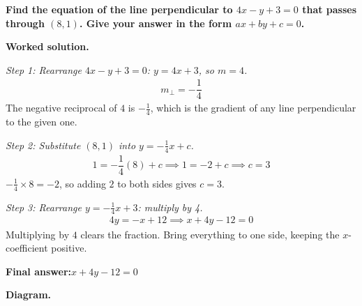 \documentclass[11pt]{article}
\newcommand{\question}[1]{\par\medskip\noindent\textbf{#1}\par}
\begin{document}
\question{Find the equation of the line perpendicular to \( 4x - y + 3 = 0 \) that passes through \( (8, 1) \). Give your answer in the form \( ax + by + c = 0 \).}

\textbf{Worked solution.}

\textit{Step 1: Rearrange \( 4x - y + 3 = 0 \): \( y = 4x + 3 \), so \( m = 4 \).}
\[\begin{gathered}
m_\perp = -\dfrac{1}{4}
\end{gathered}\]
The negative reciprocal of \( 4 \) is \( -\tfrac{1}{4} \), which is the gradient of any line perpendicular to the given one.

\textit{Step 2: Substitute \( (8, 1) \) into \( y = -\frac{1}{4}x + c \).}
\[\begin{gathered}
1 = -\dfrac{1}{4}(8) + c \implies 1 = -2 + c \implies c = 3
\end{gathered}\]
\( -\tfrac{1}{4} \times 8 = -2 \), so adding \( 2 \) to both sides gives \( c = 3 \).

\textit{Step 3: Rearrange \( y = -\frac{1}{4}x + 3 \): multiply by 4.}
\[\begin{gathered}
4y = -x + 12 \implies x + 4y - 12 = 0
\end{gathered}\]
Multiplying by \( 4 \) clears the fraction. Bring everything to one side, keeping the \( x \)-coefficient positive.

\begin{answerbox}
\textbf{Final answer:}\quad \(\displaystyle x + 4y - 12 = 0\)
\end{answerbox}
\textbf{Diagram.}
\end{document}
